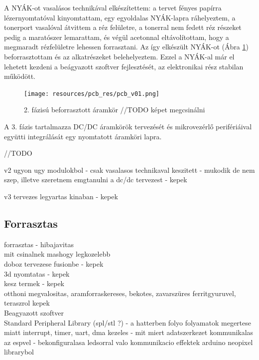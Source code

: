 \documentclass[../main.tex]{subfiles}
\begin{document}
        A NYÁK-ot vasalásos technikával elkészítettem: a tervet fényes papírra lézernyomtatóval kinyomtattam, egy egyoldalas NYÁK-lapra ráhelyeztem, a tonerport vasalóval átvittem a réz felületre, a tonerral nem fedett réz részeket pedig a maratószer lemarattam, és végül acetonnal eltávolítottam, hogy a megmaradt rézfelületre lehessen forrasztani. Az így elkészült NYÁK-ot (Ábra \ref{fig:pcb_v01}) beforrasztottam és az alkatrészeket belehelyeztem. Ezzel a NYÁK-al már el lehetett kezdeni a beágyazott szoftver fejlesztését, az elektronikai rész stabilan működött.
        
        \begin{figure}[h!]
            \centering
                \texttt{[image: resources/pcb\_res/pcb\_v01.png]}
            \caption{2. fázisú beforrasztott áramkör //TODO képet megcsinálni}
            \label{fig:pcb_v01}
        \end{figure}
        
        A 3. fázis tartalmazza DC/DC áramkörök tervezését és mikrovezérlő perifériáival együtti integrálását egy nyomtatott áramköri lapra. 
        
//TODO
        
v2 ugyon ugy modulokbol - csak vasalasos technikaval keszitett - mukodik de nem szep, illetve szeretnem emgtanulni a dc/dc tervezest - kepek\

v3 tervezes legyartas kinaban - kepek\\ 

    \subsection{Forrasztas}
forrasztas - hibajavitas\\
mit csinalnek mashogy legkozelebb\\

doboz tervezese fusionbe - kepek\\
3d nyomtatas - kepek\\
kesz termek - kepek\\

otthoni megvalositas, aramforraskereses, bekotes, zavarszüres ferritgyuruvel, teraszrol kepek\\

Beagyazott szoftver\\
Standard Peripheral Library (spl/stl ?) - a hatterben folyo folyamatok megertese miatt
interrupt, timer, uart, dma kezeles - mit miert
adatszerkezet
kommunikalas az espvel - bekonfiguralasa
ledsorral valo kommunikacio
effektek arduino neopixel librarybol 
\end{document}
